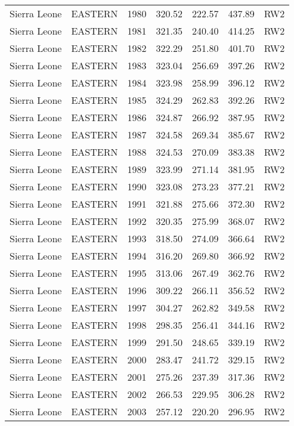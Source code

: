 \begin{longtable}{lllrrrl}
  Sierra Leone & EASTERN & 1980 & 320.52 & 222.57 & 437.89 & RW2 \\ 
  Sierra Leone & EASTERN & 1981 & 321.35 & 240.40 & 414.25 & RW2 \\ 
  Sierra Leone & EASTERN & 1982 & 322.29 & 251.80 & 401.70 & RW2 \\ 
  Sierra Leone & EASTERN & 1983 & 323.04 & 256.69 & 397.26 & RW2 \\ 
  Sierra Leone & EASTERN & 1984 & 323.98 & 258.99 & 396.12 & RW2 \\ 
  Sierra Leone & EASTERN & 1985 & 324.29 & 262.83 & 392.26 & RW2 \\ 
  Sierra Leone & EASTERN & 1986 & 324.87 & 266.92 & 387.95 & RW2 \\ 
  Sierra Leone & EASTERN & 1987 & 324.58 & 269.34 & 385.67 & RW2 \\ 
  Sierra Leone & EASTERN & 1988 & 324.53 & 270.09 & 383.38 & RW2 \\ 
  Sierra Leone & EASTERN & 1989 & 323.99 & 271.14 & 381.95 & RW2 \\ 
  Sierra Leone & EASTERN & 1990 & 323.08 & 273.23 & 377.21 & RW2 \\ 
  Sierra Leone & EASTERN & 1991 & 321.88 & 275.66 & 372.30 & RW2 \\ 
  Sierra Leone & EASTERN & 1992 & 320.35 & 275.99 & 368.07 & RW2 \\ 
  Sierra Leone & EASTERN & 1993 & 318.50 & 274.09 & 366.64 & RW2 \\ 
  Sierra Leone & EASTERN & 1994 & 316.20 & 269.80 & 366.92 & RW2 \\ 
  Sierra Leone & EASTERN & 1995 & 313.06 & 267.49 & 362.76 & RW2 \\ 
  Sierra Leone & EASTERN & 1996 & 309.22 & 266.11 & 356.52 & RW2 \\ 
  Sierra Leone & EASTERN & 1997 & 304.27 & 262.82 & 349.58 & RW2 \\ 
  Sierra Leone & EASTERN & 1998 & 298.35 & 256.41 & 344.16 & RW2 \\ 
  Sierra Leone & EASTERN & 1999 & 291.50 & 248.65 & 339.19 & RW2 \\ 
  Sierra Leone & EASTERN & 2000 & 283.47 & 241.72 & 329.15 & RW2 \\ 
  Sierra Leone & EASTERN & 2001 & 275.26 & 237.39 & 317.36 & RW2 \\ 
  Sierra Leone & EASTERN & 2002 & 266.53 & 229.95 & 306.28 & RW2 \\ 
  Sierra Leone & EASTERN & 2003 & 257.12 & 220.20 & 296.95 & RW2 \\ 

\end{longtable}
